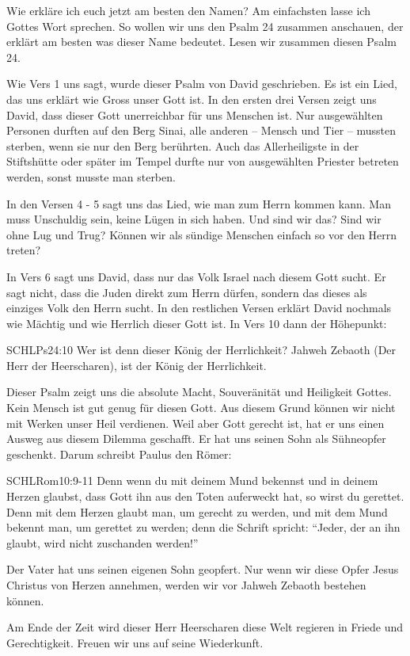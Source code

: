     \begin{otsblock}
        Wie erkläre ich euch jetzt am besten den Namen? Am einfachsten lasse ich Gottes Wort sprechen.
        So wollen wir uns den Psalm 24 zusammen anschauen, der erklärt am besten  was dieser Name bedeutet. Lesen wir zusammen diesen Psalm 24.
        
        Wie Vers 1 uns sagt, wurde dieser Psalm von David geschrieben. Es ist ein Lied, das uns erklärt wie Gross unser Gott ist. In den ersten drei Versen zeigt uns David, dass dieser Gott unerreichbar für uns Menschen ist. Nur ausgewählten Personen durften auf den Berg Sinai, alle anderen -- Mensch und Tier -- mussten sterben, wenn sie nur den Berg berührten. Auch das Allerheiligste in der Stiftshütte oder später im Tempel durfte nur von ausgewählten Priester betreten werden, sonst musste man sterben. 
        
        In den Versen 4 - 5 sagt uns das Lied, wie man zum Herrn kommen kann. Man muss Unschuldig sein, keine Lügen in sich haben. Und sind wir das? Sind wir ohne Lug und Trug? Können wir als sündige Menschen einfach so vor den Herrn treten? 

        In Vers 6 sagt uns David, dass nur das Volk Israel nach diesem Gott sucht. Er sagt nicht, dass die Juden direkt zum Herrn dürfen, sondern das dieses als einziges Volk den Herrn sucht. In den restlichen Versen erklärt David nochmals wie Mächtig und wie Herrlich dieser Gott ist. In Vers 10 dann der Höhepunkt:
        \begin{bibelbox}{SCHL}{Ps}{24:10}
            Wer ist denn dieser König der Herrlichkeit? Jahweh Zebaoth (Der Herr der Heerscharen),  ist der König der Herrlichkeit.
        \end{bibelbox}
        Dieser Psalm zeigt uns die absolute Macht, Souveränität und Heiligkeit Gottes. Kein Mensch ist gut genug für diesen Gott. Aus diesem Grund können wir nicht mit Werken unser Heil verdienen. Weil aber Gott gerecht ist, hat er uns einen Ausweg aus diesem Dilemma geschafft. Er hat uns seinen Sohn als Sühneopfer geschenkt. Darum schreibt Paulus den Römer:
        \begin{bibelbox}{SCHL}{Rom}{10:9-11}
        Denn wenn du mit deinem Mund bekennst und in deinem Herzen glaubst, dass Gott ihn aus den Toten auferweckt hat, so wirst du gerettet. Denn mit dem Herzen glaubt man, um gerecht zu werden, und mit dem Mund bekennt man, um gerettet zu werden; denn die Schrift spricht: \enquote{Jeder, der an ihn glaubt, wird nicht zuschanden werden!}
        \end{bibelbox}
        Der Vater hat uns seinen eigenen Sohn geopfert. Nur wenn wir diese Opfer Jesus Christus von Herzen annehmen, werden wir vor Jahweh Zebaoth bestehen können. 

        Am Ende der Zeit wird dieser Herr Heerscharen diese Welt regieren in Friede und Gerechtigkeit. Freuen wir uns auf seine Wiederkunft.
    \end{otsblock}